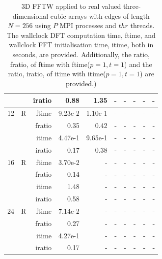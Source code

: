 \documentclass[a4paper]{article}
\begin{document}
\begin{table}[htbp]
\begin{center}
\begin{small}
\begin{tabular}{|r|r|r|r|r|r|r|r|r|r|}
             &             &  iratio &    0.88 &   1.35  &      - &      - &      - &      - &      - \\\hline
   12 &   R &   ftime &    9.23e-2 &    1.10e-1 &      - &      - &      - &      - &      - \\
             &             &  fratio &    0.35 &   0.42 &      - &      - &      - &      - &      - \\
             &             &  itime &    4.47e-1 &    9.65e-1 &      - &      - &      - &      - &      - \\
             &             &  iratio &    0.17 &    0.38 &      - &      - &      - &      - &      - \\\hline
   16 &   R &   ftime &    3.70e-2 &      - &      - &      - &      - &      - &      - \\
             &             &  fratio &    0.14 &      - &      - &      - &      - &      - &      - \\
             &             &  itime &    1.48  &      - &      - &      - &      - &      - &      - \\
             &             &  iratio &    0.58 &      - &      - &      - &      - &      - &      - \\\hline
   24 &   R &   ftime &    7.14e-2 &      - &      - &      - &      - &      - &      - \\
             &             &  fratio &    0.27 &      - &      - &      - &      - &      - &      - \\
             &             &  itime &    4.27e-1 &      - &      - &      - &      - &      - &      - \\
             &             &  iratio &    0.17 &      - &      - &      - &      - &      - &      - \\\hline
\end{tabular}
\caption{3D FFTW applied to real valued three-dimensional cubic arrays with edges of length $N=256$ using $P$ MPI processes and $thr$ threads. The wallclock DFT computation time, ftime, and wallclock FFT initialisation time, itime, both in seconds, are provided. Additionally, the ratio, fratio, of ftime  with ftime($p=1,t=1$) and the ratio, iratio, of itime  with itime($p=1,t=1$) are provided.) }\label{Tbl:FFTW3d256}
\end{small}
\end{center}
\end{table}
\end{document}
